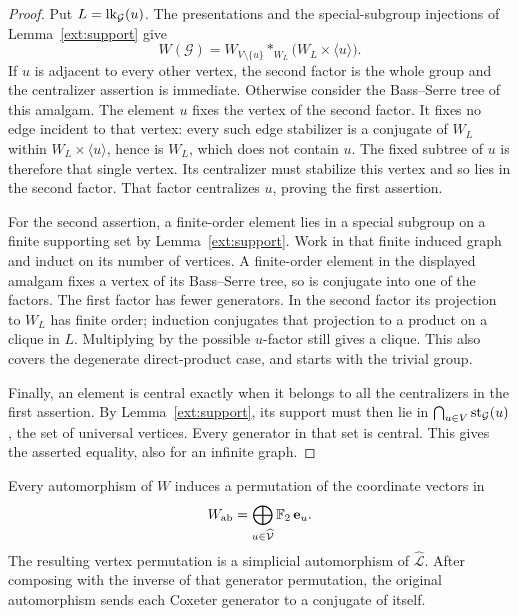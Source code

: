 \begin{proof}
Put $L=\operatorname{lk}_{\mathcal G}(u)$.  The presentations and the
special-subgroup injections of Lemma~\ref{ext:support} give
\[
 W(\mathcal G)
 =W_{V\setminus\{u\}}*_{W_L}
       \bigl(W_L\times\langle u\rangle\bigr).
\]
If $u$ is adjacent to every other vertex, the second factor is
the whole group and the centralizer assertion is immediate.
Otherwise consider the Bass--Serre tree of this amalgam.  The
element $u$ fixes the vertex of the second factor.  It fixes no
edge incident to that vertex: every such edge stabilizer is a
conjugate of $W_L$ within $W_L\times\langle u\rangle$, hence is
$W_L$, which does not contain $u$.  The fixed subtree of $u$
is therefore that single vertex.  Its centralizer must
stabilize this vertex and so lies in the second factor.  That
factor centralizes $u$, proving the first assertion.

For the second assertion, a finite-order element lies in a
special subgroup on a finite supporting set by
Lemma~\ref{ext:support}.  Work in that finite induced graph and
induct on its number of vertices.  A finite-order element in
the displayed amalgam fixes a vertex of its Bass--Serre tree,
so is conjugate into one of the factors.  The first factor has
fewer generators.  In the second factor its projection to
$W_L$ has finite order; induction conjugates that projection
to a product on a clique in $L$.  Multiplying by the possible
$u$-factor still gives a clique.  This also covers the
degenerate direct-product case, and starts with the trivial
group.

Finally, an element is central exactly when it belongs to all
the centralizers in the first assertion.  By
Lemma~\ref{ext:support}, its support must then lie in
$\bigcap_{u\in V}\operatorname{st}_{\mathcal G}(u)$, the set of universal
vertices.  Every generator in that set is central.  This gives
the asserted equality, also for an infinite graph.
\end{proof}

\begin{lemma}\label{nor:generator-lines}
Every automorphism of $W$ induces a permutation of the
coordinate vectors in
\[
 W_{\mathrm{ab}}
   =\bigoplus_{u\in\widehat{\mathcal V}}\mathbb F_2\,\mathbf e_u.
\]
The resulting vertex permutation is a simplicial automorphism
of $\widehat{\mathcal L}$.  After composing with the inverse of
that generator permutation, the original automorphism sends
each Coxeter generator to a conjugate of itself.
\end{lemma}

